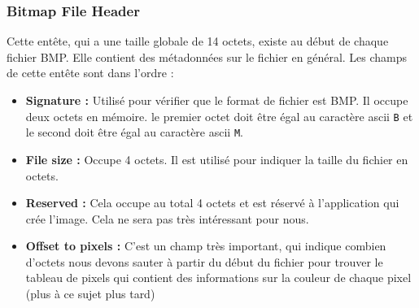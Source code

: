 \documentclass[a4paper]{article}
\begin{document}
	\subsubsection*{Bitmap File Header}
	Cette entête, qui a une taille globale de 14 octets, existe au début de chaque fichier BMP. Elle contient des métadonnées sur le fichier en général. Les champs de cette entête sont dans l'ordre :
	\begin{itemize}
		\item \textbf{Signature :} Utilisé pour vérifier que le format de fichier est BMP. Il occupe deux octets en mémoire. le premier octet doit être égal au caractère ascii \texttt{B} et le second doit être égal au caractère ascii \texttt{M}.
		\item \textbf{File size : } Occupe 4 octets. Il est utilisé pour indiquer la taille du fichier en octets.
		\item \textbf{Reserved : } Cela occupe au total 4 octets et est réservé à l'application qui crée l'image. Cela ne sera pas très intéressant pour nous.
		\item \textbf{Offset to pixels : } C'est un champ très important, qui indique combien d'octets nous devons sauter à partir du début du fichier pour trouver le tableau de pixels qui contient des informations sur la couleur de chaque pixel (plus à ce sujet plus tard)
	\end{itemize}
	
\end{document}
